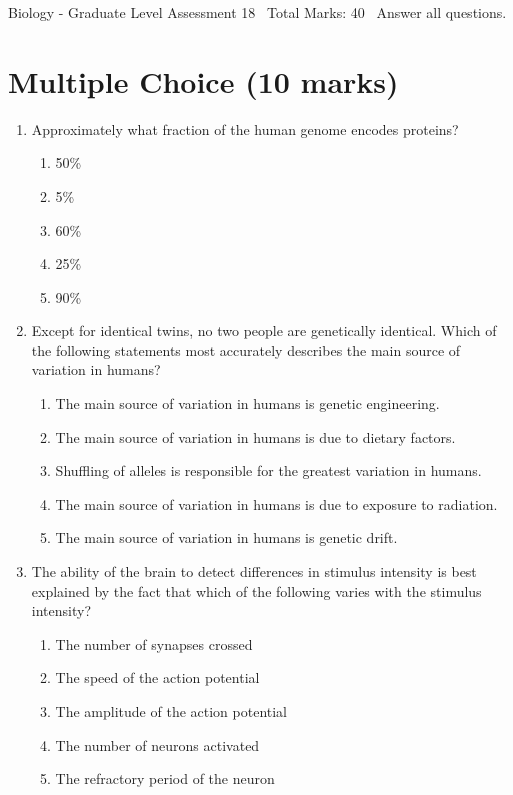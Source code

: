 \documentclass[12pt]{article}
\begin{document}
\begin{center}
Biology - Graduate Level Assessment 18 \
Total Marks: 40 \
Answer all questions.
\end{center}

\section*{Multiple Choice (10 marks)}
\begin{enumerate}[label=\arabic*.]
\item Approximately what fraction of the human genome encodes proteins?
\begin{enumerate}[label=(\alph*)]
    \item 50\%
    \item 5\%
    \item 60\%
    \item 25\%
    \item 90\%
\end{enumerate}
\item Except for identical twins, no two people are genetically identical. Which of the following statements most accurately describes the main source of variation in humans?
\begin{enumerate}[label=(\alph*)]
    \item The main source of variation in humans is genetic engineering.
    \item The main source of variation in humans is due to dietary factors.
    \item Shuffling of alleles is responsible for the greatest variation in humans.
    \item The main source of variation in humans is due to exposure to radiation.
    \item The main source of variation in humans is genetic drift.
\end{enumerate}
\item The ability of the brain to detect differences in stimulus intensity is best explained by the fact that which of the following varies with the stimulus intensity?
\begin{enumerate}[label=(\alph*)]
    \item The number of synapses crossed
    \item The speed of the action potential
    \item The amplitude of the action potential
    \item The number of neurons activated
    \item The refractory period of the neuron

\end{enumerate}
\end{enumerate}
\end{document}
